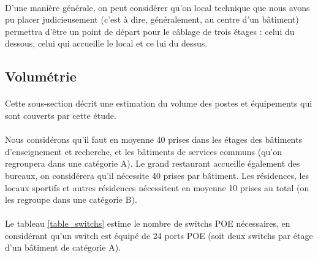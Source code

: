 \paragraph{} D'une manière générale, on peut considérer qu'on local technique
que nous avons pu placer judicieusement (c'est à dire, généralement, au centre
d'un bâtiment) permettra d'être un point de départ pour le câblage de trois
étages : celui du dessous, celui qui accueille le local et ce lui du dessus.

\subsection{Volumétrie}

\paragraph{} Cette sous-section décrit une estimation du volume des postes et
équipements qui sont couverts par cette étude.

\paragraph{} Nous considérons qu'il faut en moyenne 40 prises dans les étages
des bâtiments d'enseignement et recherche, et les bâtiments de services communs
(qu'on regroupera dans une catégorie A).
Le grand restaurant accueille également des bureaux, on considérera
qu'il nécessite 40 prises par bâtiment. Les résidences, les locaux sportifs et
autres résidences nécessitent en moyenne 10 prises au total (on les regroupe
    dans une catégorie B).

\paragraph{} Le tableau \ref{table_switchs} estime le nombre de switchs \ac{POE}
nécessaires, en considérant qu'un switch est équipé de 24 ports \ac{POE} (soit
deux switchs par étage d'un bâtiment de catégorie A).

